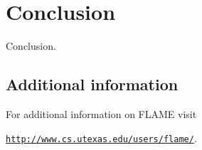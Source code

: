 \section{Conclusion}
\label{sec:conclusion}

Conclusion.


\subsection*{Additional information}

For additional information on FLAME visit
\begin{center}
\href{http://www.cs.utexas.edu/users/flame/}
     {\tt http://www.cs.utexas.edu/users/flame/}.
\end{center}
